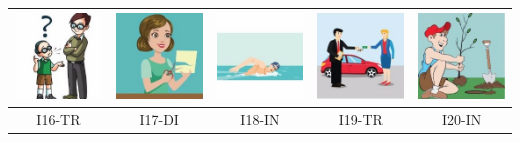 \documentclass[12pt,notitlepage]{article}
\begin{document}
\begin{center}
\begin{tabular}{|c||c||c||c||c|}
\includegraphics[width=0.16\columnwidth]{square/I11.jpg} &  \includegraphics[width=0.16\columnwidth]{square/I12.jpg} & \includegraphics[width=0.16\columnwidth]{square/I13.jpg} & \includegraphics[width=0.16\columnwidth]{square/I14.jpg} &  \includegraphics[width=0.16\columnwidth]{square/I15.jpg} \\
\hline
\hline
I16-TR & I17-DI & I18-IN & I19-TR & I20-IN \\

\end{tabular}
\end{center}
\end{document}
